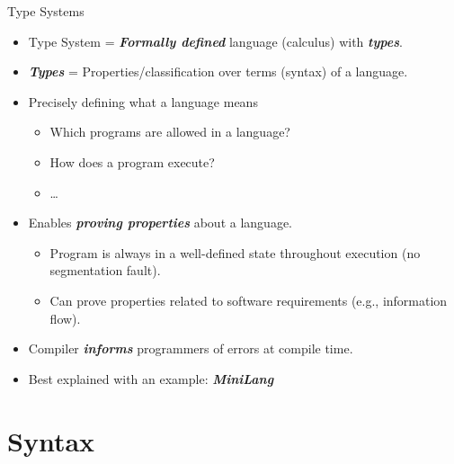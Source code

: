 \documentclass{beamer}
\renewcommand{\emph}[1]{\textbf{\textit{#1}}}
\begin{document}
\begin{frame}{Type Systems}

\begin{itemize}
\item Type System =
\emph{Formally defined} language (calculus) with \emph{types}.

\item
\emph{Types} = Properties/classification over terms (syntax) of a language.

\pause
\item Precisely defining what a language means
  \begin{itemize}
  \item Which programs are allowed in a language?
  \item How does a program execute?
  \item \ldots
  \end{itemize}

\pause  
\item Enables \emph{proving properties} about a language.
  \begin{itemize}
  \item Program is always in a well-defined state throughout
  execution (no segmentation fault).
  \item Can prove properties related to software requirements
  (e.g., information flow).
  \end{itemize}

\pause
\item Compiler \emph{informs} programmers of errors at compile time.

\pause
\item Best explained with an example: \emph{MiniLang}
\end{itemize}
\end{frame}


\section{Syntax}
\end{document}
